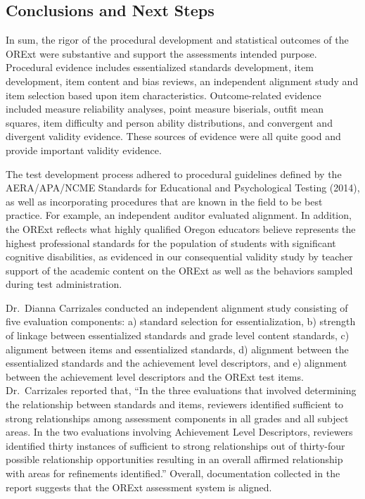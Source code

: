 \documentclass[]{article}
\begin{document}
\subsection{Conclusions and Next
Steps}\label{conclusions-and-next-steps}

In sum, the rigor of the procedural development and statistical outcomes
of the ORExt were substantive and support the assessments intended
purpose. Procedural evidence includes essentialized standards
development, item development, item content and bias reviews, an
independent alignment study and item selection based upon item
characteristics. Outcome-related evidence included measure reliability
analyses, point measure biserials, outfit mean squares, item difficulty
and person ability distributions, and convergent and divergent validity
evidence. These sources of evidence were all quite good and provide
important validity evidence.

The test development process adhered to procedural guidelines defined by
the AERA/APA/NCME Standards for Educational and Psychological Testing
(2014), as well as incorporating procedures that are known in the field
to be best practice. For example, an independent auditor evaluated
alignment. In addition, the ORExt reflects what highly qualified Oregon
educators believe represents the highest professional standards for the
population of students with significant cognitive disabilities, as
evidenced in our consequential validity study by teacher support of the
academic content on the ORExt as well as the behaviors sampled during
test administration.

Dr.~Dianna Carrizales conducted an independent alignment study
consisting of five evaluation components: a) standard selection for
essentialization, b) strength of linkage between essentialized standards
and grade level content standards, c) alignment between items and
essentialized standards, d) alignment between the essentialized
standards and the achievement level descriptors, and e) alignment
between the achievement level descriptors and the ORExt test items.
Dr.~Carrizales reported that, ``In the three evaluations that involved
determining the relationship between standards and items, reviewers
identified sufficient to strong relationships among assessment
components in all grades and all subject areas. In the two evaluations
involving Achievement Level Descriptors, reviewers identified thirty
instances of sufficient to strong relationships out of thirty-four
possible relationship opportunities resulting in an overall affirmed
relationship with areas for refinements identified.'' Overall,
documentation collected in the report suggests that the ORExt assessment
system is aligned.
\end{document}
